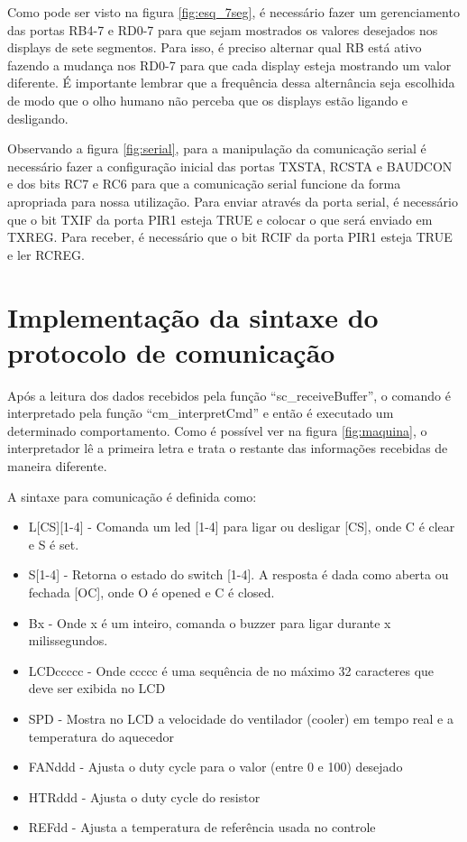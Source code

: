 \documentclass{article}
\begin{document}
Como pode ser visto na figura \ref{fig:esq_7seg}, é necessário fazer um gerenciamento das portas RB4-7 e RD0-7 para que sejam mostrados os valores desejados nos displays de sete segmentos. Para isso, é preciso alternar qual RB está ativo fazendo a mudança nos RD0-7 para que cada display esteja mostrando um valor diferente. É importante lembrar que a frequência dessa alternância seja escolhida de modo que o olho humano não perceba que os displays estão ligando e desligando.

Observando a figura \ref{fig:serial}, para a manipulação da comunicação serial é necessário fazer a configuração inicial das portas TXSTA, RCSTA e BAUDCON e dos bits RC7 e RC6 para que a comunicação serial funcione da forma apropriada para nossa utilização.  Para enviar através da porta serial, é necessário que o bit TXIF da porta PIR1 esteja TRUE e colocar o que será enviado em TXREG. Para receber, é necessário que o bit RCIF da porta PIR1 esteja TRUE e ler RCREG.

\section{Implementação da sintaxe do protocolo de comunicação}

Após a leitura dos dados recebidos pela função ``sc\_receiveBuffer'', o comando é interpretado pela função ``cm\_interpretCmd'' e então é executado um determinado comportamento. Como é possível ver na figura \ref{fig:maquina}, o interpretador lê a primeira letra e trata o restante das informações recebidas de maneira diferente.

A sintaxe para comunicação é definida como:
\begin{itemize}
\item L[CS][1-4] - Comanda um led [1-4] para ligar ou desligar [CS], onde C é clear e S é set.
\item S[1-4] - Retorna o estado do switch [1-4]. A resposta é dada como aberta ou fechada [OC], onde O é opened e C é closed.
\item Bx - Onde x é um inteiro, comanda o buzzer para ligar durante x milissegundos.
\item LCDccccc - Onde ccccc é uma sequência de no máximo 32 caracteres que deve ser exibida no LCD
\item SPD - Mostra no LCD a velocidade do ventilador (cooler) em tempo real e a temperatura do aquecedor
\item FANddd - Ajusta o duty cycle para o valor (entre 0 e 100) desejado
\item HTRddd - Ajusta o duty cycle do resistor
\item REFdd - Ajusta a temperatura de referência usada no controle
\end{itemize}
\end{document}
